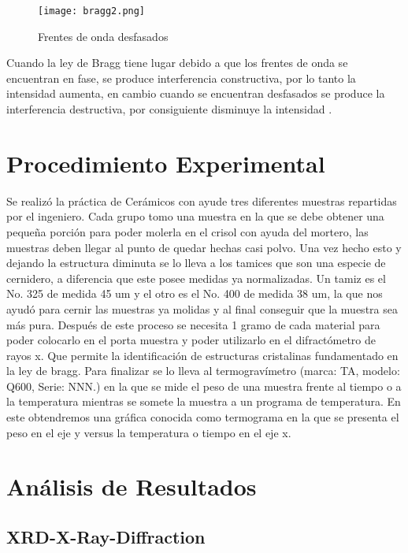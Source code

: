 \documentclass[a4paper, 11pt]{article}
\begin{document}
\begin{figure}[h!] 
\centering
    \texttt{[image: bragg2.png]}
     \caption{Frentes de onda desfasados}
    \label{ley_de_bragg2}
\end{figure}

Cuando la ley de Bragg tiene lugar debido a que los frentes de onda se encuentran en fase, se produce interferencia constructiva, por lo tanto la intensidad aumenta, en cambio cuando se encuentran desfasados se produce la interferencia destructiva, por consiguiente disminuye la intensidad \cite{no1}.



\section{Procedimiento Experimental}

Se realizó la práctica de Cerámicos con ayude tres diferentes muestras repartidas por el ingeniero. Cada grupo tomo una muestra en la que se debe obtener una pequeña porción para poder molerla en el crisol con ayuda del mortero, las muestras deben llegar al punto de quedar hechas casi polvo. Una vez hecho esto y dejando la estructura diminuta se lo lleva a los tamices que son una especie de cernidero, a diferencia que este posee medidas ya normalizadas. 
Un tamiz es el No. 325 de medida 45 um y el otro es el No. 400 de medida 38 um, la que nos ayudó para cernir  las muestras ya molidas y al final conseguir que la muestra sea más pura. Después de este proceso se necesita 1 gramo de cada material para poder colocarlo en el porta muestra y poder utilizarlo en el difractómetro de rayos x.  Que permite la identificación de estructuras cristalinas fundamentado en la ley de bragg. 
Para finalizar se lo lleva al termogravímetro (marca: TA, modelo: Q600, Serie: NNN.) en la que se mide el peso de una muestra frente al tiempo o a la temperatura mientras se somete la muestra a un programa de temperatura. En este obtendremos una gráfica conocida como termograma en la que se presenta el peso en el eje y versus la temperatura o tiempo en el eje x.


\section{An\'alisis de Resultados}

\subsection{XRD-X-Ray-Diffraction}
\end{document}
